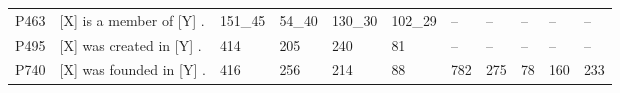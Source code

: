 \begin{tabular}{|l|l|l|l|l|l|l|l|l|l|l|}
 P463                      & [X] is a member of [Y] .              & 151_{45} & 54_{40}  & 130_{30} & 102_{29} & --   & --       & --       & --      & --       \\
 P495                      & [X] was created in [Y] .              & 414      & 205      & 240      & 81       & --   & --       & --       & --      & --       \\
 P740                      & [X] was founded in [Y] .              & 416      & 256      & 214      & 88       & 782  & 275      & 78       & 160     & 233      \\
\hline
\end{tabular}